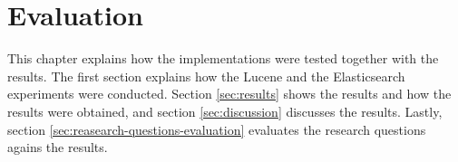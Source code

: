 \chapter{Evaluation}
\label{ch:evaluation}
This chapter explains how the implementations were tested together with the results.
The first section explains how the Lucene and the Elasticsearch experiments were conducted.
Section \ref{sec:results} shows the results and how the results were obtained,
and section \ref{sec:discussion} discusses the results.
Lastly, section \ref{sec:reasearch-questions-evaluation} evaluates the research questions agains the results.






\cleardoublepage
